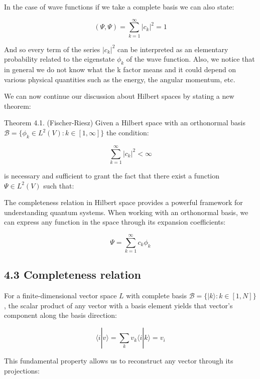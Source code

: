 \documentclass[italian]{HKNdocument}
\begin{document}
In the case of wave functions if we take a complete basis we can also state:

\begin{equation*}
(\Psi, \Psi) = \sum_{k=1}^{\infty}|c_k|^2 = 1 \tag{4.21}
\end{equation*}

And so every term of the series $|c_k|^2$ can be interpreted as an elementary probability related to the eigenstate $\phi_k$ of the wave function. Also, we notice that in general we do not know what the k factor means and it could depend on various physical quantities such as the energy, the angular momentum, etc.

We can now continue our discussion about Hilbert spaces by stating a new theorem:

Theorem 4.1. (Fischer-Riesz) Given a Hilbert space with an orthonormal basis $\mathcal{B} = \{\phi_k \in L^2(V): k \in [1,\infty]\}$ the condition:

\begin{equation*}
\sum_{k=1}^{\infty}|c_k|^2 < \infty \tag{4.22}
\end{equation*}

is necessary and sufficient to grant the fact that there exist a function $\Psi \in L^2(V)$ such that:


The completeness relation in Hilbert space provides a powerful framework for understanding quantum systems. When working with an orthonormal basis, we can express any function in the space through its expansion coefficients:

\begin{equation*}
\Psi = \sum_{k=1}^{\infty} c_k\phi_k \tag{4.23}
\end{equation*}

\subsection*{4.3 Completeness relation}

For a finite-dimensional vector space $L$ with complete basis $\mathcal{B} = \{|k\rangle: k \in [1,N]\}$, the scalar product of any vector with a basis element yields that vector's component along the basis direction:

\begin{equation*}
\langle i|v\rangle = \sum_k v_k\langle i|k\rangle = v_i \tag{4.24}
\end{equation*}

This fundamental property allows us to reconstruct any vector through its projections:
\end{document}
